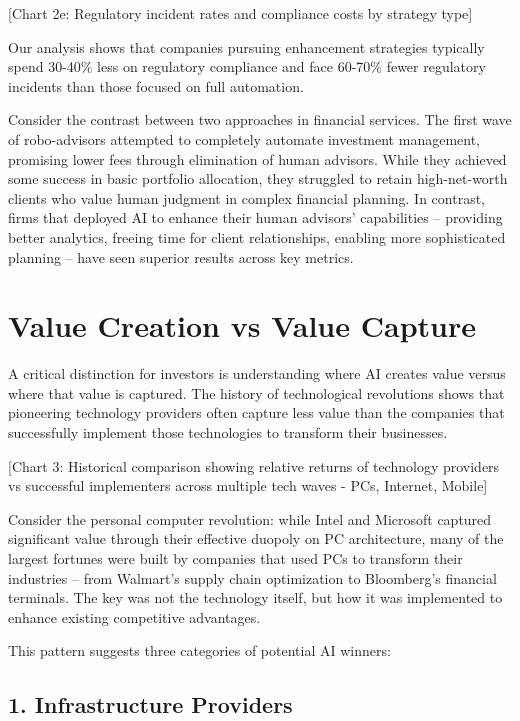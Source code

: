\documentclass[
  Letterpaper,
]{scrbook}
\begin{document}
{[}Chart 2e: Regulatory incident rates and compliance costs by strategy
type{]}

Our analysis shows that companies pursuing enhancement strategies
typically spend 30-40\% less on regulatory compliance and face 60-70\%
fewer regulatory incidents than those focused on full automation.

Consider the contrast between two approaches in financial services. The
first wave of robo-advisors attempted to completely automate investment
management, promising lower fees through elimination of human advisors.
While they achieved some success in basic portfolio allocation, they
struggled to retain high-net-worth clients who value human judgment in
complex financial planning. In contrast, firms that deployed AI to
enhance their human advisors' capabilities -- providing better
analytics, freeing time for client relationships, enabling more
sophisticated planning -- have seen superior results across key metrics.

\section{Value Creation vs Value
Capture}\label{value-creation-vs-value-capture}

A critical distinction for investors is understanding where AI creates
value versus where that value is captured. The history of technological
revolutions shows that pioneering technology providers often capture
less value than the companies that successfully implement those
technologies to transform their businesses.

{[}Chart 3: Historical comparison showing relative returns of technology
providers vs successful implementers across multiple tech waves - PCs,
Internet, Mobile{]}

Consider the personal computer revolution: while Intel and Microsoft
captured significant value through their effective duopoly on PC
architecture, many of the largest fortunes were built by companies that
used PCs to transform their industries -- from Walmart's supply chain
optimization to Bloomberg's financial terminals. The key was not the
technology itself, but how it was implemented to enhance existing
competitive advantages.

This pattern suggests three categories of potential AI winners:

\subsection{1. Infrastructure Providers}\label{infrastructure-providers}
\end{document}
